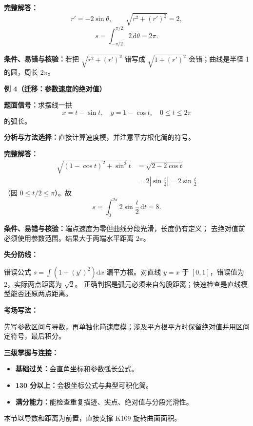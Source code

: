 \begin{knowledgeBox}
\textbf{完整解答：}
\[
r'=-2\sin\theta,\qquad
\sqrt{r^2+(r')^2}=2,
\]
\[
s=\int_{-\pi/2}^{\pi/2}2\,\mathrm d\theta=2\pi.
\]

\textbf{条件、易错与核验：}若把 \(\sqrt{r^2+(r')^2}\) 错写成
\(\sqrt{1+(r')^2}\) 会错；曲线是半径 1 的圆，周长 \(2\pi\)。

\textbf{例 4（迁移：参数速度的绝对值）}

\textbf{题面信号：}求摆线一拱
\[
x=t-\sin t,\quad y=1-\cos t,\quad0\le t\le2\pi
\]
的弧长。

\textbf{分析与方法选择：}直接计算速度模，并注意平方根化简的符号。

\textbf{完整解答：}
\[
\begin{aligned}
\sqrt{(1-\cos t)^2+\sin^2t}
&=\sqrt{2-2\cos t}\\
&=2\left|\sin\frac t2\right|
=2\sin\frac t2
\end{aligned}
\]
（因 \(0\le t/2\le\pi\)）。故
\[
s=\int_0^{2\pi}2\sin\frac t2\,\mathrm dt=8.
\]

\textbf{条件、易错与核验：}端点速度为零但曲线分段光滑，长度仍有定义；
去绝对值前必须使用参数范围。结果大于两端水平距离 \(2\pi\)。

\textbf{失分防线：}

错误公式 \(s=\int(1+(y')^2)\mathrm dx\) 漏平方根。对直线
\(y=x\) 于 \([0,1]\)，错误值为 \(2\)，实际两点距离为 \(\sqrt2\)。
正确判据是弧元必须来自勾股距离；快速检查是直线模型能否还原两点距离。

\textbf{考场写法：}

先写参数区间与导数，再单独化简速度模；涉及平方根平方时保留绝对值并用区间
定符号，最后积分。

\textbf{三级掌握与连接：}
\begin{itemize}
  \item \textbf{基础过关：}会直角坐标和参数弧长公式。
  \item \textbf{130 分以上：}会极坐标公式与典型可积化简。
  \item \textbf{满分能力：}能检查重复描迹、尖点、绝对值与分段光滑性。
\end{itemize}
本节以导数和距离为前置，直接支撑 K109 旋转曲面面积。
\end{knowledgeBox}


\par

